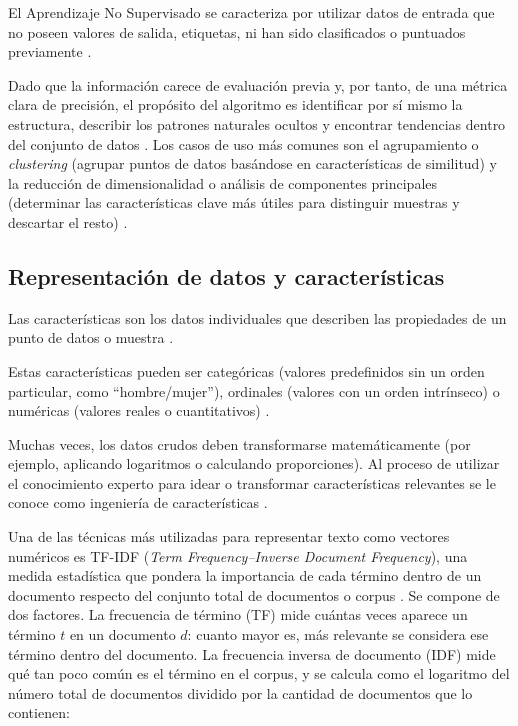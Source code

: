 El Aprendizaje No Supervisado se caracteriza por utilizar datos de entrada que no poseen valores de salida, etiquetas, ni han sido clasificados o puntuados previamente \parencite{GandhiGandhi2022, VerbrakkenEtAl2020}.

Dado que la información carece de evaluación previa y, por tanto, de una métrica clara de precisión, el propósito del algoritmo es identificar por sí mismo la estructura, describir los patrones naturales ocultos y encontrar tendencias dentro del conjunto de datos \parencite{GandhiGandhi2022, VerbrakkenEtAl2020}. Los casos de uso más comunes son el agrupamiento o \emph{clustering} (agrupar puntos de datos basándose en características de similitud) y la reducción de dimensionalidad o análisis de componentes principales (determinar las características clave más útiles para distinguir muestras y descartar el resto) \parencite{GandhiGandhi2022, VerbrakkenEtAl2020}.

\subsection{Representación de datos y características}\label{subsec:representacion_datos}

Las características son los datos individuales que describen las propiedades de un punto de datos o muestra \parencite{BadilloEtAl2020}.

Estas características pueden ser categóricas (valores predefinidos sin un orden particular, como \enquote{hombre/mujer}), ordinales (valores con un orden intrínseco) o numéricas (valores reales o cuantitativos) \parencite{BadilloEtAl2020}.

Muchas veces, los datos crudos deben transformarse matemáticamente (por ejemplo, aplicando logaritmos o calculando proporciones). Al proceso de utilizar el conocimiento experto para idear o transformar características relevantes se le conoce como ingeniería de características \parencite{BadilloEtAl2020}.

Una de las técnicas más utilizadas para representar texto como vectores numéricos es TF-IDF (\emph{Term Frequency--Inverse Document Frequency}), una medida estadística que pondera la importancia de cada término dentro de un documento respecto del conjunto total de documentos o corpus \parencite{AlObaydyEtAl2022}. Se compone de dos factores. La frecuencia de término (TF) mide cuántas veces aparece un término $t$ en un documento $d$: cuanto mayor es, más relevante se considera ese término dentro del documento. La frecuencia inversa de documento (IDF) mide qué tan poco común es el término en el corpus, y se calcula como el logaritmo del número total de documentos dividido por la cantidad de documentos que lo contienen:

